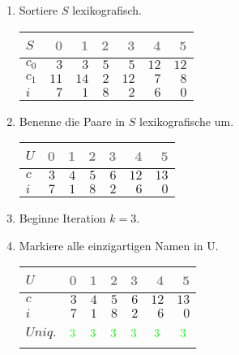 \begin{enumerate}
\item 
Sortiere $S$ lexikografisch.
\begin{center}
\small\begin{tabular}{lrrrrrr}
    \toprule 
    $S$ & \textcolor{gray}{0} & \textcolor{gray}{1} & \textcolor{gray}{2} & \textcolor{gray}{3} & \textcolor{gray}{4} & \textcolor{gray}{5}\\
    \midrule 
    $c_0$ & $3$ & $3$ & $5$ & $5$ & $12$ & $12$ \\
    $c_1$ & $11$ & $14$ & $2$ & $12$ & $7$ & $8$ \\
    $i$ & $7$ & $1$ & $8$ & $2$ & $6$ & $0$ \\
    \bottomrule 
\end{tabular}
\end{center}

\item 
Benenne die Paare in $S$ lexikografische um.
\begin{center}
\small\begin{tabular}{lrrrrrr}
    \toprule 
    $U$ & \textcolor{gray}{0} & \textcolor{gray}{1} & \textcolor{gray}{2} & \textcolor{gray}{3} & \textcolor{gray}{4} & \textcolor{gray}{5}\\
    \midrule 
    $c$ & $3$ & $4$ & $5$ & $6$ & $12$ & $13$ \\
    $i$ & $7$ & $1$ & $8$ & $2$ & $6$ & $0$ \\
    \bottomrule 
\end{tabular}
\end{center}
\item 
Beginne Iteration $k = 3$.

\item 
Markiere alle einzigartigen Namen in U.
\begin{center}
\small\begin{tabular}{lrrrrrr}
    \toprule 
    $U$ & \textcolor{gray}{0} & \textcolor{gray}{1} & \textcolor{gray}{2} & \textcolor{gray}{3} & \textcolor{gray}{4} & \textcolor{gray}{5}\\
    \midrule 
    $c$ & $3$ & $4$ & $5$ & $6$ & $12$ & $13$ \\
    $i$ & $7$ & $1$ & $8$ & $2$ & $6$ & $0$ \\
    $Uniq.$ & $$\cmarkc$$ & $$\cmarkc$$ & $$\cmarkc$$ & $$\cmarkc$$ & $$\cmarkc$$ & $$\cmarkc$$ \\
    \bottomrule 
\end{tabular}
\end{center}


\end{enumerate}
